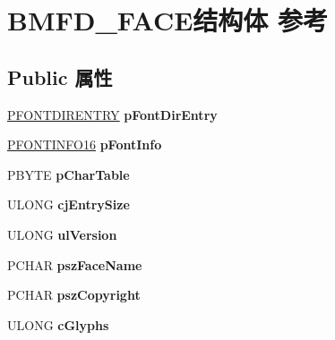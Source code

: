 \hypertarget{struct_b_m_f_d___f_a_c_e}{}\section{B\+M\+F\+D\+\_\+\+F\+A\+C\+E结构体 参考}
\label{struct_b_m_f_d___f_a_c_e}
\subsection*{Public 属性}
\begin{DoxyCompactItemize}
\item 
\mbox{\label{struct_b_m_f_d___f_a_c_e_a43d953e3eaea122cd18e845e9a350bf6}} 
\hyperlink{struct___f_o_n_t_d_i_r_e_n_t_r_y}{P\+F\+O\+N\+T\+D\+I\+R\+E\+N\+T\+RY} {\bfseries p\+Font\+Dir\+Entry}
\item 
\mbox{\label{struct_b_m_f_d___f_a_c_e_aba6d1d2efb8d8d6bcd3e8cc1399f8969}} 
\hyperlink{struct_f_o_n_t_i_n_f_o16}{P\+F\+O\+N\+T\+I\+N\+F\+O16} {\bfseries p\+Font\+Info}
\item 
\mbox{\label{struct_b_m_f_d___f_a_c_e_a99fba12220f5be09dd4e3e1e103b158f}} 
P\+B\+Y\+TE {\bfseries p\+Char\+Table}
\item 
\mbox{\label{struct_b_m_f_d___f_a_c_e_a52b43d551df1c86a8865b46f7adfaaf2}} 
U\+L\+O\+NG {\bfseries cj\+Entry\+Size}
\item 
\mbox{\label{struct_b_m_f_d___f_a_c_e_a1883e9b3ef8f49317bc9fd7a75fe82a6}} 
U\+L\+O\+NG {\bfseries ul\+Version}
\item 
\mbox{\label{struct_b_m_f_d___f_a_c_e_ad5fe75b52ead0d6ecd5cc176ed550233}} 
P\+C\+H\+AR {\bfseries psz\+Face\+Name}
\item 
\mbox{\label{struct_b_m_f_d___f_a_c_e_ac7107b4030a03ed330893d83b462856e}} 
P\+C\+H\+AR {\bfseries psz\+Copyright}
\item 
\mbox{\label{struct_b_m_f_d___f_a_c_e_aa598ebd5f8275e52dfd28426a3139ae2}} 
U\+L\+O\+NG {\bfseries c\+Glyphs}
\item 

\end{DoxyCompactItemize}

